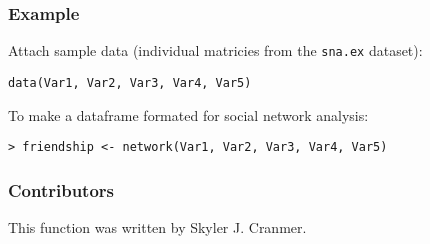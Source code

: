 \subsubsection{Example}

Attach sample data (individual matricies from the {\tt sna.ex} dataset):
\begin{verbatim}
data(Var1, Var2, Var3, Var4, Var5)
\end{verbatim} 

To make a dataframe formated for social network analysis:
\begin{verbatim}
> friendship <- network(Var1, Var2, Var3, Var4, Var5)
\end{verbatim}

\subsubsection{Contributors}
This function was written by Skyler J. Cranmer. 
